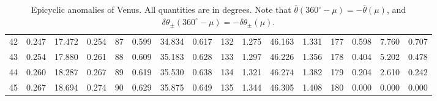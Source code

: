 \begin{table}[!h]
{\begin{tabular}{rrrr|rrrr|rrrr|rrrr}
 42 & \tiny{  0.247} &  17.472 & \tiny{  0.254} &  87 & \tiny{  0.599} &  34.834 & \tiny{  0.617} & 132 & \tiny{  1.275} &  46.163 & \tiny{  1.331} & 177 & \tiny{  0.598} &   7.760 & \tiny{  0.707}\\
 43 & \tiny{  0.254} &  17.880 & \tiny{  0.261} &  88 & \tiny{  0.609} &  35.183 & \tiny{  0.628} & 133 & \tiny{  1.297} &  46.226 & \tiny{  1.356} & 178 & \tiny{  0.404} &   5.202 & \tiny{  0.478}\\
 44 & \tiny{  0.260} &  18.287 & \tiny{  0.267} &  89 & \tiny{  0.619} &  35.530 & \tiny{  0.638} & 134 & \tiny{  1.321} &  46.274 & \tiny{  1.382} & 179 & \tiny{  0.204} &   2.610 & \tiny{  0.242}\\
 45 & \tiny{  0.267} &  18.694 & \tiny{  0.274} &  90 & \tiny{  0.629} &  35.875 & \tiny{  0.649} & 135 & \tiny{  1.344} &  46.305 & \tiny{  1.408} & 180 & \tiny{  0.000} &   0.000 & \tiny{  0.000}\\
\end{tabular}}
\caption{Epicyclic anomalies of Venus. All quantities are in degrees. Note that $\bar{\theta}(360^\circ-\mu) = -\bar{\theta}(\mu)$, and $\delta\theta_{\pm}(360^\circ-\mu) = -\delta\theta_{\pm}(\mu)$. }\label{vt19}
\end{table}


